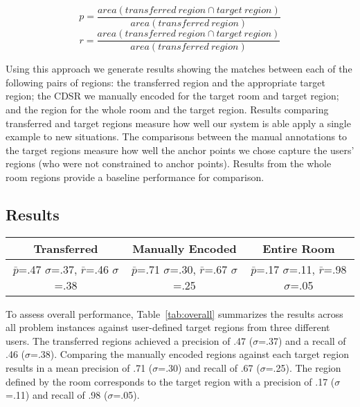 \begin{equation}
	p=\frac{area(transferred\ region \cap target\ region)}{area(transferred\ region)}
\end{equation}
\begin{equation}
	r=\frac{area(transferred\ region \cap target\ region)}{area(transferred\ region)}
\end{equation}

Using this approach we generate results showing the matches between each of the following pairs of regions: the transferred region and the appropriate target region; the CDSR we manually encoded for the target room and target region; and the region for the whole room and the target region. 
Results comparing transferred and target regions measure how well our system is able apply a single example to new situations. The comparisons between the manual annotations to the target regions measure how well the anchor points we chose capture the users' regions (who were not constrained to anchor points). Results from the whole room regions provide a baseline performance for comparison. 


\subsection{Results}
\begin{table*}
	\center
\begin{tabular}{|c|c|c|}
\hline
Transferred & Manually Encoded & Entire Room \\
\hline
$\bar{p}$=.47 $\sigma$=.37, $\bar{r}$=.46 $\sigma$=.38 & $\bar{p}$=.71 $\sigma$=.30, $\bar{r}$=.67 $\sigma$=.25 & $\bar{p}$=.17 $\sigma$=.11, $\bar{r}$=.98 $\sigma$=.05  \\
\hline
\end{tabular}
\caption{Overall Performance}
  \label{tab:overall}	

\end{table*}

To assess overall performance, Table~\ref{tab:overall} summarizes the results across all problem instances against user-defined target regions from three different users. The transferred regions achieved a precision of .47 ($\sigma$=.37) and a recall of .46 ($\sigma$=.38). Comparing the manually encoded regions against each target region results in a mean precision of .71 ($\sigma$=.30) and recall of .67 ($\sigma$=.25). The region defined by the room corresponds to the target region with a precision of .17 ($\sigma$=.11) and recall of .98 ($\sigma$=.05).


